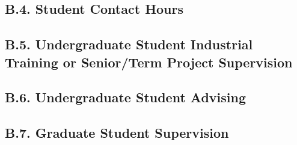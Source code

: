 \documentclass[10pt]{article}
\newcommand{\junk}[1]{}
\begin{document}
\junk{

\subsection*{B.3. Educational development activities}


}

\subsection*{B.4. Student Contact Hours}



\subsection*{B.5. Undergraduate Student Industrial Training or Senior/Term Project Supervision}




\subsection*{B.6. Undergraduate Student Advising}




\subsection*{B.7. Graduate Student Supervision}
\end{document}
